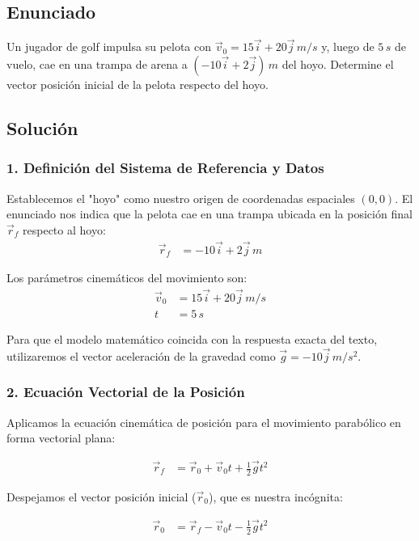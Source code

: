 \documentclass[12pt, a4paper]{article}
\begin{document}
\newpage

\subsection*{Enunciado}
Un jugador de golf impulsa su pelota con $\vec{v}_0 = 15\vec{i} + 20\vec{j} \, \si{m/s}$ y, luego de $5 \, \si{s}$ de vuelo, cae en una trampa de arena a $(-10\vec{i} + 2\vec{j}) \, \si{m}$ del hoyo. Determine el vector posición inicial de la pelota respecto del hoyo.

\subsection*{Solución}

\subsubsection*{1. Definición del Sistema de Referencia y Datos}
Establecemos el "hoyo" como nuestro origen de coordenadas espaciales $(0,0)$. 
El enunciado nos indica que la pelota cae en una trampa ubicada en la posición final $\vec{r}_f$ respecto al hoyo:
\begin{align*}
\vec{r}_f &= -10\vec{i} + 2\vec{j} \, \si{m}
\end{align*}

Los parámetros cinemáticos del movimiento son:
\begin{align*}
\vec{v}_0 &= 15\vec{i} + 20\vec{j} \, \si{m/s} \\
t &= 5 \, \si{s}
\end{align*}

Para que el modelo matemático coincida con la respuesta exacta del texto, utilizaremos el vector aceleración de la gravedad como $\vec{g} = -10\vec{j} \, \si{m/s^2}$.

\subsubsection*{2. Ecuación Vectorial de la Posición}
Aplicamos la ecuación cinemática de posición para el movimiento parabólico en forma vectorial plana:

\begin{align*}
\vec{r}_f &= \vec{r}_0 + \vec{v}_0 t + \frac{1}{2} \vec{g} t^2
\end{align*}

Despejamos el vector posición inicial ($\vec{r}_0$), que es nuestra incógnita:

\begin{align*}
\vec{r}_0 &= \vec{r}_f - \vec{v}_0 t - \frac{1}{2} \vec{g} t^2
\end{align*}
\end{document}

